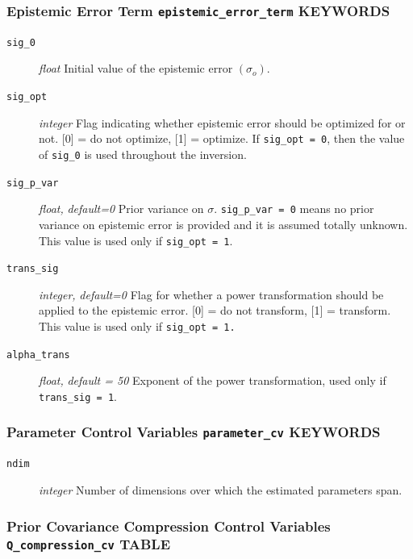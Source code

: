 \documentclass[11pt,oneside,onecolumn]{usgsreport}
\begin{document}
\begin{appendix}
\begin{bibunit}
\subsubsection{Epistemic Error Term \texttt{epistemic\_error\_term} KEYWORDS}
\begin{description}
\item [{\texttt{sig\_0}}] \emph{float }Initial value of the epistemic error
$\left(\sigma_{o}\right)$.
\item [{\texttt{sig\_opt}}] \emph{integer }Flag indicating whether epistemic
error should be optimized for or not. {[}0{]} = do not optimize, {[}1{]}
= optimize. If \texttt{sig\_opt = 0}, then the value of \texttt{sig\_0}
is used throughout the inversion.
\item [{\texttt{sig\_p\_var}}] \emph{float, }\textit{default=0}\emph{ }Prior
variance on $\sigma$. \texttt{sig\_p\_var = 0} means no prior variance
on epistemic error is provided and it is assumed totally unknown.
This value is used only if \texttt{sig\_opt = 1}. 
\item [{\texttt{trans\_sig}}] \emph{integer, }\textit{default=0}\emph{
}Flag for whether a power transformation should be applied to the
epistemic error. {[}0{]} = do not transform, {[}1{]} = transform.
This value is used only if \texttt{sig\_opt = 1.} 
\item [{\texttt{alpha\_trans}}] \emph{float, }\textit{default = 50} Exponent
of the power transformation, used only if \texttt{trans\_sig = 1}.

\end{description}

\subsubsection{Parameter Control Variables \texttt{parameter\_cv} KEYWORDS}
\begin{description}
\item [{\texttt{ndim}}] \emph{integer} Number of dimensions over which
the estimated parameters span.
\end{description}

\subsubsection{Prior Covariance Compression Control Variables \texttt{Q\_compression\_cv}
TABLE}


\end{bibunit}
\end{appendix}
\end{document}
